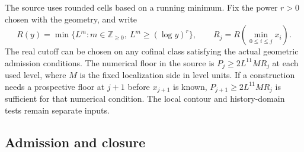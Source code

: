 \documentclass[11pt,letterpaper,reqno]{amsart}
\numberwithin{equation}{section}
\theoremstyle{definition}
\theoremstyle{remark}
\begin{document}
The source uses rounded cells based on a running minimum. Fix the
power \(r>0\) chosen with the geometry, and write
\begin{equation}\label{rt:eq-running-cell}
 R(y)=\min\{L^m:m\in\mathbb Z_{\ge0},\ L^m\ge(\log y)^r\},
 \qquad R_j=R\!\left(\min_{0\le i\le j}x_i\right).
\end{equation}
The real cutoff can be chosen on any cofinal class satisfying the
actual geometric admission conditions. The numerical floor in the
source is \(P_j\ge 2L^{11}M R_j\) at each used level, where \(M\)
is the fixed localization side in level units. If a construction
needs a prospective floor at \(j+1\) before \(x_{j+1}\) is known,
\(P_{j+1}\ge2L^{11}M R_j\) is sufficient for that numerical
condition. The local contour and history-domain tests remain
separate inputs.

\subsection{Admission and closure}
\end{document}
